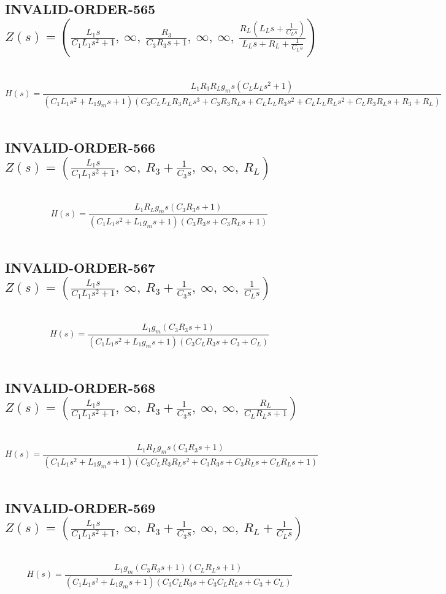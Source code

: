 \documentclass{article}
\begin{document}
\subsection{INVALID-ORDER-565 $Z(s) = \left( \frac{L_{1} s}{C_{1} L_{1} s^{2} + 1}, \  \infty, \  \frac{R_{3}}{C_{3} R_{3} s + 1}, \  \infty, \  \infty, \  \frac{R_{L} \left(L_{L} s + \frac{1}{C_{L} s}\right)}{L_{L} s + R_{L} + \frac{1}{C_{L} s}}\right)$ } \ 
\textbf{\[H(s) = \frac{L_{1} R_{3} R_{L} g_{m} s \left(C_{L} L_{L} s^{2} + 1\right)}{\left(C_{1} L_{1} s^{2} + L_{1} g_{m} s + 1\right) \left(C_{3} C_{L} L_{L} R_{3} R_{L} s^{3} + C_{3} R_{3} R_{L} s + C_{L} L_{L} R_{3} s^{2} + C_{L} L_{L} R_{L} s^{2} + C_{L} R_{3} R_{L} s + R_{3} + R_{L}\right)}\] } \ 
\subsection{INVALID-ORDER-566 $Z(s) = \left( \frac{L_{1} s}{C_{1} L_{1} s^{2} + 1}, \  \infty, \  R_{3} + \frac{1}{C_{3} s}, \  \infty, \  \infty, \  R_{L}\right)$ } \ 
\textbf{\[H(s) = \frac{L_{1} R_{L} g_{m} s \left(C_{3} R_{3} s + 1\right)}{\left(C_{1} L_{1} s^{2} + L_{1} g_{m} s + 1\right) \left(C_{3} R_{3} s + C_{3} R_{L} s + 1\right)}\] } \ 
\subsection{INVALID-ORDER-567 $Z(s) = \left( \frac{L_{1} s}{C_{1} L_{1} s^{2} + 1}, \  \infty, \  R_{3} + \frac{1}{C_{3} s}, \  \infty, \  \infty, \  \frac{1}{C_{L} s}\right)$ } \ 
\textbf{\[H(s) = \frac{L_{1} g_{m} \left(C_{3} R_{3} s + 1\right)}{\left(C_{1} L_{1} s^{2} + L_{1} g_{m} s + 1\right) \left(C_{3} C_{L} R_{3} s + C_{3} + C_{L}\right)}\] } \ 
\subsection{INVALID-ORDER-568 $Z(s) = \left( \frac{L_{1} s}{C_{1} L_{1} s^{2} + 1}, \  \infty, \  R_{3} + \frac{1}{C_{3} s}, \  \infty, \  \infty, \  \frac{R_{L}}{C_{L} R_{L} s + 1}\right)$ } \ 
\textbf{\[H(s) = \frac{L_{1} R_{L} g_{m} s \left(C_{3} R_{3} s + 1\right)}{\left(C_{1} L_{1} s^{2} + L_{1} g_{m} s + 1\right) \left(C_{3} C_{L} R_{3} R_{L} s^{2} + C_{3} R_{3} s + C_{3} R_{L} s + C_{L} R_{L} s + 1\right)}\] } \ 
\subsection{INVALID-ORDER-569 $Z(s) = \left( \frac{L_{1} s}{C_{1} L_{1} s^{2} + 1}, \  \infty, \  R_{3} + \frac{1}{C_{3} s}, \  \infty, \  \infty, \  R_{L} + \frac{1}{C_{L} s}\right)$ } \ 
\textbf{\[H(s) = \frac{L_{1} g_{m} \left(C_{3} R_{3} s + 1\right) \left(C_{L} R_{L} s + 1\right)}{\left(C_{1} L_{1} s^{2} + L_{1} g_{m} s + 1\right) \left(C_{3} C_{L} R_{3} s + C_{3} C_{L} R_{L} s + C_{3} + C_{L}\right)}\] } \ 
\end{document}
